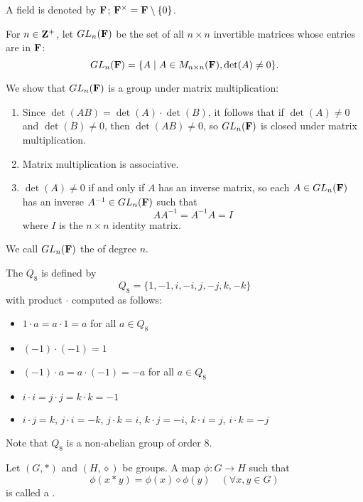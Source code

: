 \begin{example}

A field is denoted by $\mathbf F$; $\mathbf F^\times=\mathbf F\setminus\{0\}$.

For $n\in\mathbf Z^+$, let $GL_n(\mathbf F)$ be the set of all $n\times n$ invertible matrices whose entries are in $\mathbf F$:
\[GL_n(\mathbf F)=\{A\mid A\in M_{n\times n}(\mathbf F),\det(A)\neq0\}.\]

We show that $GL_n(\mathbf F)$ is a group under matrix multiplication:
\begin{enumerate}[label=(\roman*)]
\item Since $\det(AB)=\det(A)\cdot\det(B)$, it follows that if $\det(A)\neq0$ and $\det(B)\neq0$, then $\det(AB)\neq0$, so $GL_n(\mathbf F)$ is closed under matrix multiplication.
\item Matrix multiplication is associative.
\item $\det(A)\neq0$ if and only if $A$ has an inverse matrix, so each $A\in GL_n(\mathbf F)$ has an inverse $A^{-1}\in GL_n(\mathbf F)$ such that
\[AA^{-1}=A^{-1}A=I\]
where $I$ is the $n\times n$ identity matrix.
\end{enumerate}

We call $GL_n(\mathbf F)$ the  of degree $n$.
\end{example}

\begin{example}
The  $Q_8$ is defined by
\[Q_8=\{1,-1,i,-i,j,-j,k,-k\}\]
with product $\cdot$ computed as follows:
\begin{itemize}
\item $1\cdot a=a\cdot 1=a$ for all $a\in Q_8$
\item $(-1)\cdot(-1)=1$
\item $(-1)\cdot a=a\cdot(-1)=-a$ for all $a\in Q_8$
\item $i\cdot i=j\cdot j=k\cdot k=-1$
\item $i\cdot j=k$, $j\cdot i=-k$, $j\cdot k=i$, $k\cdot j=-i$, $k\cdot i=j$, $i\cdot k=-j$
\end{itemize}
Note that $Q_8$ is a non-abelian group of order $8$.
\end{example}

\begin{definition}[Homomorphism]
Let $(G,\ast)$ and $(H,\diamond)$ be groups. A map $\phi:G\to H$ such that
\[\phi(x\ast y)=\phi(x)\diamond\phi(y)\quad(\forall x,y\in G)\]
is called a .
\end{definition}

